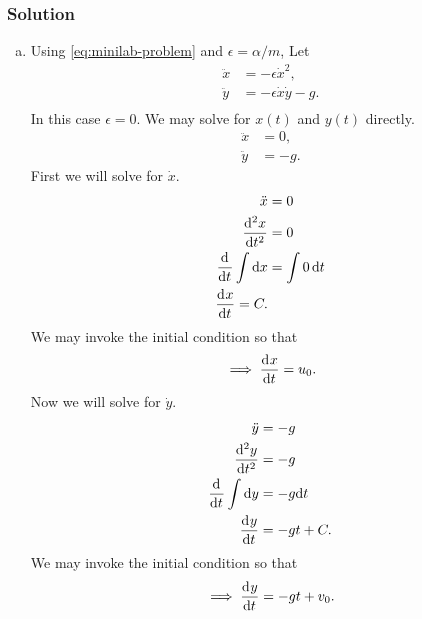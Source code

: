 \documentclass[12pt]{article}
\begin{document}
\subsubsection*{Solution}
\begin{enumerate}[(a)]
\item Using \cref{eq:minilab-problem} and $\epsilon=\alpha/m$, Let
  \begin{equation}
    \label{eq:minilab-1-let}
    \begin{aligned}
      \ddot{x} &= -\epsilon\dot{x}^2, \\
      \ddot{y} &= -\epsilon\dot{x}\dot{y}-g. \\
    \end{aligned}
  \end{equation}
  In this case $\epsilon = 0$. We may solve for $x(t)$ and $y(t)$ directly.
  \begin{equation*}
    \begin{aligned}
      \ddot{x} &= 0, \\
      \ddot{y} &= -g.
    \end{aligned}
  \end{equation*}
  First we will solve for $\dot{x}$.
  \begin{equation*}
    \begin{aligned}
      \ddot{x} &= 0 \\
      \od[2]{x}{t} &= 0 \\
      \od{}{t}\int\dd{x} &= \int 0\, \dd{t} \\
      \od{x}{t} = C. \\
    \end{aligned}
  \end{equation*}
  We may invoke the initial condition so that
  \begin{equation*}
    \implies\od{x}{t} = u_0.
  \end{equation*}
  Now we will solve for $\dot{y}$.
  \begin{equation*}
    \begin{aligned}
      \ddot{y} &= -g \\
      \od[2]{y}{t} &= -g \\
      \od{}{t}\int\dd{y} &= -g\dd{t} \\
      \od{y}{t} &= -gt + C. \\
    \end{aligned}
  \end{equation*}
  We may invoke the initial condition so that
  \begin{equation*}
    \implies \od{y}{t} = -gt + v_0.

\end{equation*}
\end{enumerate}
\end{document}
